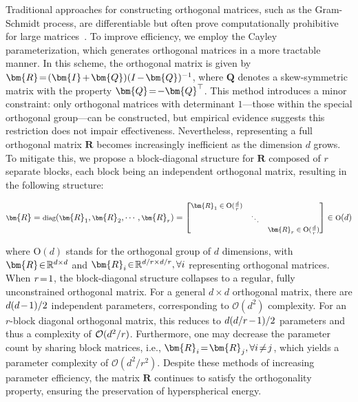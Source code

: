 Traditional approaches for constructing orthogonal matrices, such as the Gram-Schmidt process, are differentiable but often prove computationally prohibitive for large matrices~\cite{liu2021orthogonal}. To improve efficiency, we employ the Cayley parameterization, which generates orthogonal matrices in a more tractable manner. In this scheme, the orthogonal matrix is given by $\thickmuskip=2mu \medmuskip=2mu \bm{R} = (\bm{I} + \bm{Q})(I - \bm{Q})^{-1}$, where $\bm{Q}$ denotes a skew-symmetric matrix with the property $\thickmuskip=2mu \medmuskip=2mu \bm{Q} = -\bm{Q}^\top$. This method introduces a minor constraint: only orthogonal matrices with determinant $1$—those within the special orthogonal group—can be constructed, but empirical evidence suggests this restriction does not impair effectiveness. Nevertheless, representing a full orthogonal matrix $\bm{R}$ becomes increasingly inefficient as the dimension $d$ grows. To mitigate this, we propose a block-diagonal structure for $\bm{R}$ composed of $r$ separate blocks, each block being an independent orthogonal matrix, resulting in the following structure:

\begin{equation}
    \footnotesize
    \bm{R} = \text{diag}(\bm{R}_1, \bm{R}_2, \cdots, \bm{R}_r) = \begin{bmatrix}
    \bm{R}_1 \in \text{O}(\frac{d}{r}) &  &\\
    &\ddots & \\
    & & \bm{R}_r \in \text{O}(\frac{d}{r})
    \end{bmatrix} \in \text{O}(d)
\end{equation}

where $\text{O}(d)$ stands for the orthogonal group of $d$ dimensions, with $\thickmuskip=2mu \medmuskip=2mu \bm{R}\in\mathbb{R}^{d\times d}$ and $\thickmuskip=2mu \medmuskip=2mu \bm{R}_i\in\mathbb{R}^{d/r\times d/r},\forall i$ representing orthogonal matrices. When $\thickmuskip=2mu \medmuskip=2mu r=1$, the block-diagonal structure collapses to a regular, fully unconstrained orthogonal matrix. For a general $d\times d$ orthogonal matrix, there are $\thickmuskip=2mu \medmuskip=2mu d(d-1)/2$ independent parameters, corresponding to $\mathcal{O}(d^2)$ complexity. For an $r$-block diagonal orthogonal matrix, this reduces to $\thickmuskip=2mu \medmuskip=2mu d(d/r-1)/2$ parameters and thus a complexity of $\thickmuskip=2mu \medmuskip=2mu \mathcal{O}(d^2/r)$. Furthermore, one may decrease the parameter count by sharing block matrices, i.e., $\thickmuskip=2mu \medmuskip=2mu\bm{R}_i=\bm{R}_j,\forall i\neq j$, which yields a parameter complexity of $\mathcal{O}(d^2/r^2)$. Despite these methods of increasing parameter efficiency, the matrix $\bm{R}$ continues to satisfy the orthogonality property, ensuring the preservation of hyperspherical energy.

